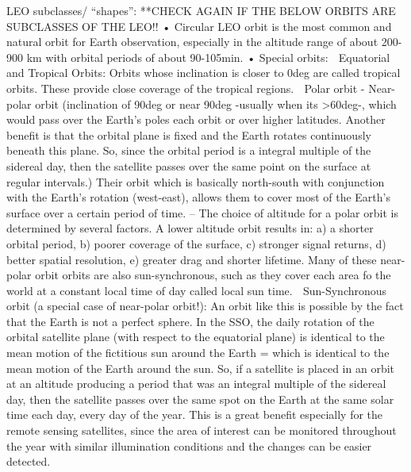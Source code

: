 LEO subclasses/ “shapes”:
**CHECK AGAIN IF THE BELOW ORBITS ARE SUBCLASSES OF THE LEO!!
•	Circular LEO orbit is the most common and natural orbit for Earth observation, especially in the altitude range of about 200-900 km with orbital periods of about 90-105min.
•	Special orbits:
   Equatorial and Tropical Orbits: Orbits whose inclination is closer to 0deg are called tropical orbits. These provide close coverage of the tropical regions.
	Polar orbit - Near-polar orbit (inclination of 90deg or near 90deg -usually when its >60deg-, which would pass over the Earth's poles each orbit or over higher latitudes. Another benefit is that the orbital plane is fixed and the Earth rotates continuously beneath this plane. So, since the orbital period is a integral multiple of the sidereal day, then the satellite passes over the same point on the surface at regular intervals.) Their orbit which is basically north-south with conjunction with the Earth's rotation (west-east), allows them to cover most of the Earth's surface over a certain period of time.
-- The choice of altitude for a polar orbit is determined by several factors. A lower altitude orbit results in: a) a shorter orbital period, b) poorer coverage of the surface, c) stronger signal returns, d) better spatial resolution, e) greater drag and shorter lifetime.
Many of these near-polar orbit orbits are also sun-synchronous, such as they cover each area fo the world at a constant local time of day called local sun time.
	Sun-Synchronous orbit (a special case of near-polar orbit!):
An orbit like this is possible by the fact that the Earth is not a perfect sphere. In the SSO, the daily rotation of the orbital satellite plane (with respect to the equatorial plane) is identical to the mean motion of the fictitious sun around the Earth = which is identical to the mean motion of the Earth around the sun. So, if a satellite is placed in an orbit at an altitude producing a period that was an integral multiple of the sidereal day, then the satellite passes over the same spot on the Earth at the same solar time each day, every day of the year. This is a great benefit especially for the remote sensing satellites, since the area of interest can be monitored throughout the year with similar illumination conditions and the changes can be easier detected.
